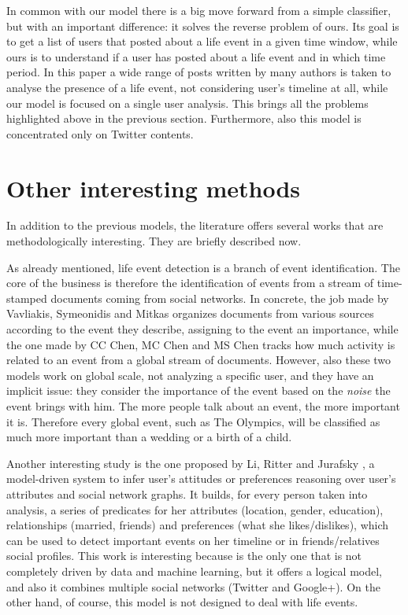 In common with our model there is a big move forward from a simple classifier, but with an important difference: it solves the reverse problem of ours. Its goal is to get a list of users that posted about a life event in a given time window, while ours is to understand if a user has posted about a life event and in which time period. In this paper a wide range of posts written by many authors is taken to analyse the presence of a life event, not considering user's timeline at all, while our model is focused on a single user analysis. This brings all the problems highlighted above in the previous section. Furthermore, also this model is  concentrated only on Twitter contents.

\section{Other interesting methods}
In addition to the previous models, the literature offers several works that are methodologically interesting. They are briefly described now.

As already mentioned, life event detection is a branch of event identification. The core of the business is therefore the identification of events from a stream of time-stamped documents coming from social networks. In concrete, the job made by Vavliakis, Symeonidis and Mitkas \cite{vavliakis2013event} organizes documents from various sources according to the event they describe, assigning to the event an importance, while the one made by CC Chen, MC Chen and MS Chen \cite{chen2009adaptive} tracks how much activity is related to an event from a global stream of documents. However, also these two models work on global scale, not analyzing a specific user, and they have an implicit issue: they consider the importance of the event based on the \emph{noise} the event brings with him. The more people talk about an event, the more important it is. Therefore every global event, such as The Olympics, will be classified as much more important than a wedding or a birth of a child.

Another interesting study is the one proposed by Li, Ritter and Jurafsky \cite{li2014inferring}, a model-driven system to infer user's attitudes or preferences reasoning over user's attributes and social network graphs. It builds, for every person taken into analysis, a series of predicates for her attributes (location, gender, education), relationships (married, friends) and preferences (what she likes/dislikes), which can be used to detect important events on her timeline or in friends/relatives social profiles. This work is interesting because is the only one that is not completely driven by data and machine learning, but it offers a logical model, and also it combines multiple social networks (Twitter and Google+). On the other hand, of course, this model is not designed to deal with life events.

